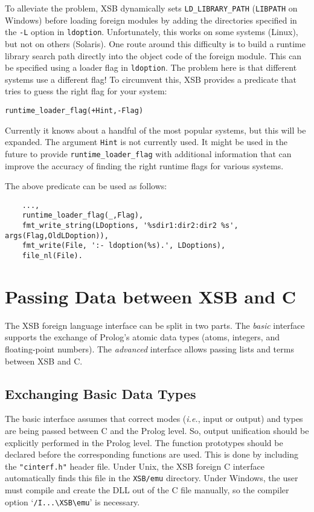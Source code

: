 To alleviate the problem, XSB dynamically sets {\tt LD\_LIBRARY\_PATH}
({\tt LIBPATH} on Windows) before loading foreign modules by adding the
directories specified in the {\tt -L} option in {\tt ldoption}.
Unfortunately, this works on some systems (Linux), but not on others
(Solaris). One route around this difficulty is to build a runtime library
search path directly into the object code of the foreign module. This can
be specified using a loader flag in {\tt ldoption}.  The problem here is
that different systems use a different flag!  To circumvent this, XSB
provides a predicate that tries to guess the right flag for your system:
\begin{verbatim}
runtime_loader_flag(+Hint,-Flag)  
\end{verbatim}
Currently it knows about a handful of the most popular systems, but this
will be expanded. The argument {\tt Hint} is not currently used.
It might be used in the future to provide {\tt runtime\_loader\_flag} with
additional information that can improve the accuracy of finding the right
runtime flags for various systems.

The above predicate can be used as follows:
\begin{verbatim}
    ...,
    runtime_loader_flag(_,Flag),
    fmt_write_string(LDoptions, '%sdir1:dir2:dir2 %s', args(Flag,OldLDoption)),
    fmt_write(File, ':- ldoption(%s).', LDoptions),
    file_nl(File).
\end{verbatim}


\section{Passing Data between XSB and C}

The XSB foreign language interface can be split in two parts.
The \emph{basic} interface supports the exchange of Prolog's 
atomic data types (atoms, integers, and floating-point numbers). 
The \emph{advanced} interface allows passing lists and terms between XSB
and C.

\subsection{Exchanging Basic Data Types}
The basic interface assumes that correct modes ({\it i.e.}, input or
output) and types are being passed between C and the Prolog level.  So,
output unification should be explicitly performed in the Prolog level.  The
function prototypes should be declared before the corresponding functions
are used.  This is done by including the {\tt "cinterf.h"} header file.
Under Unix, the XSB foreign C interface automatically finds this file in
the {\tt XSB/emu} directory. Under Windows, the user must compile and
create the DLL out of the C file manually, so the compiler option
`\verb|/I...\XSB\emu|' is necessary.

